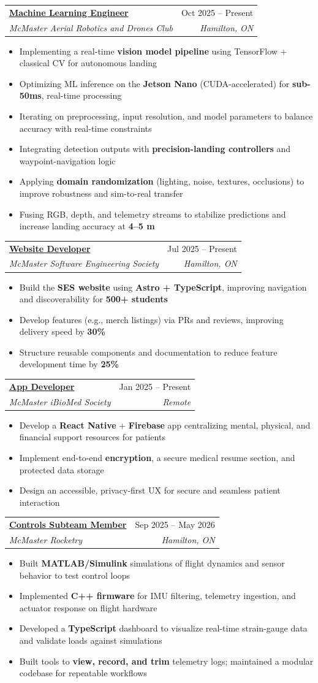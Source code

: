 \documentclass[letterpaper,11pt]{article}
\makeatletter
\newcommand{\resumeItem}[1]{\item\small{{#1 \vspace{-2pt}}}}
\newcommand{\resumeSubheading}[4]{
  \vspace{-2pt}\item
  \begin{tabular*}{0.97\textwidth}[t]{l@{\extracolsep{\fill}}r}
    \textbf{#1} & #2 \\
    \textit{\small#3} & \textit{\small#4} \\
  \end{tabular*}\vspace{-7pt}
}
\newcommand{\resumeItemListStart}{\begin{itemize}}
\newcommand{\resumeItemListEnd}{\end{itemize}\vspace{-5pt}}
\makeatother
\begin{document}
  \resumeSubheading
    {\href{https://www.macdrones.ca}{Machine Learning Engineer \faLink}}{Oct 2025 -- Present}
    {McMaster Aerial Robotics and Drones Club}{Hamilton, ON}
  \resumeItemListStart
    \resumeItem{Implementing a real-time \textbf{vision model pipeline} using TensorFlow + classical CV for autonomous landing}
    \resumeItem{Optimizing ML inference on the \textbf{Jetson Nano} (CUDA-accelerated) for \textbf{sub-50ms}, real-time processing}
    \resumeItem{Iterating on preprocessing, input resolution, and model parameters to balance accuracy with real-time constraints}
    \resumeItem{Integrating detection outputs with \textbf{precision-landing controllers} and waypoint-navigation logic}
    \resumeItem{Applying \textbf{domain randomization} (lighting, noise, textures, occlusions) to improve robustness and sim-to-real transfer}
    \resumeItem{Fusing RGB, depth, and telemetry streams to stabilize predictions and increase landing accuracy at \textbf{4--5 m}}
  \resumeItemListEnd

  \resumeSubheading
    {\href{https://ses.eng.mcmaster.ca}{Website Developer \faLink}}{Jul 2025 -- Present}
    {McMaster Software Engineering Society}{Hamilton, ON}
  \resumeItemListStart
    \resumeItem{Build the \textbf{SES website} using \textbf{Astro + TypeScript}, improving navigation and discoverability for \textbf{500+ students}}
    \resumeItem{Develop features (e.g., merch listings) via PRs and reviews, improving delivery speed by \textbf{30\%}}
    \resumeItem{Structure reusable components and documentation to reduce feature development time by \textbf{25\%}}
  \resumeItemListEnd

  \resumeSubheading
    {\href{https://www.mahadhssn.com/logbook/sclerocare}{App Developer \faLink}}{Jan 2025 -- Present}
    {McMaster iBioMed Society}{Remote}
  \resumeItemListStart
    \resumeItem{Develop a \textbf{React Native} + \textbf{Firebase} app centralizing mental, physical, and financial support resources for patients}
    \resumeItem{Implement end-to-end \textbf{encryption}, a secure medical resume section, and protected data storage}
    \resumeItem{Design an accessible, privacy-first UX for secure and seamless patient interaction}
  \resumeItemListEnd

  \resumeSubheading
    {\href{https://www.macrocketry.ca}{Controls Subteam Member \faLink}}{Sep 2025 -- May 2026}
    {McMaster Rocketry}{Hamilton, ON}
  \resumeItemListStart
    \resumeItem{Built \textbf{MATLAB/Simulink} simulations of flight dynamics and sensor behavior to test control loops}
    \resumeItem{Implemented \textbf{C++ firmware} for IMU filtering, telemetry ingestion, and actuator response on flight hardware}
    \resumeItem{Developed a \textbf{TypeScript} dashboard to visualize real-time strain-gauge data and validate loads against simulations}
    \resumeItem{Built tools to \textbf{view, record, and trim} telemetry logs; maintained a modular codebase for repeatable workflows}
  \resumeItemListEnd
\end{document}
